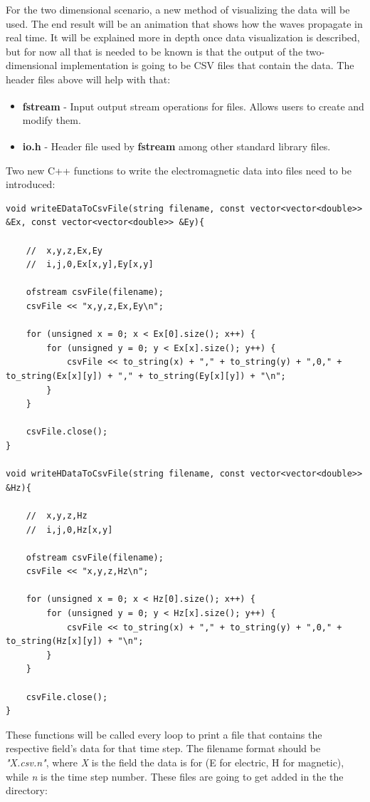 For the two dimensional scenario, a new method of visualizing the data will be used. The end result will be an animation that shows how the waves propagate in real time. It will be explained more in depth once data visualization is described, but for now all that is needed to be known is that the output of the two-dimensional implementation is going to be CSV files that contain the data. The header files above will help with that:

\begin{itemize}
	\item \textbf{fstream}\textsuperscript{\cite{fstream}} - Input output stream operations for files. Allows users to create and modify them.
	\item \textbf{io.h}\textsuperscript{\cite{io.h}} - Header file used by \textbf{fstream} among other standard library files.
\end{itemize}

Two new C++ functions to write the electromagnetic data into files need to be introduced:

\begin{verbatim}
void writeEDataToCsvFile(string filename, const vector<vector<double>> &Ex, const vector<vector<double>> &Ey){
	
	//	x,y,z,Ex,Ey
	//	i,j,0,Ex[x,y],Ey[x,y]
	
	ofstream csvFile(filename);
	csvFile << "x,y,z,Ex,Ey\n";
	
	for (unsigned x = 0; x < Ex[0].size(); x++) {
		for (unsigned y = 0; y < Ex[x].size(); y++) {
			csvFile << to_string(x) + "," + to_string(y) + ",0," + to_string(Ex[x][y]) + "," + to_string(Ey[x][y]) + "\n";
		}
	}
	
	csvFile.close();
}

void writeHDataToCsvFile(string filename, const vector<vector<double>> &Hz){
	
	//	x,y,z,Hz
	//	i,j,0,Hz[x,y]
	
	ofstream csvFile(filename);
	csvFile << "x,y,z,Hz\n";
	
	for (unsigned x = 0; x < Hz[0].size(); x++) {
		for (unsigned y = 0; y < Hz[x].size(); y++) {
			csvFile << to_string(x) + "," + to_string(y) + ",0," + to_string(Hz[x][y]) + "\n";
		}
	}
	
	csvFile.close();
}
\end{verbatim}

These functions will be called every loop to print a file that contains the respective field's data for that time step. The filename format should be \textit{"X.csv.n"}, where \textit{X} is the field the data is for (E for electric, H for magnetic), while \textit{n} is the time step number. These files are going to get added in the the directory: 

